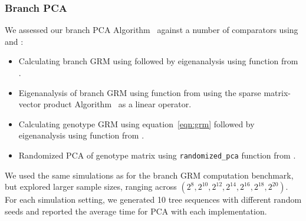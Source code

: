 \subsubsection{Branch PCA}

We assessed our branch PCA Algorithm~ against a number of comparators
using \scipy{} \citep{Virtanen2020SciPy} and \scikitallel{} \citep{Miles2024scikit}:
%
\begin{itemize}
    \item Calculating branch GRM using \tsGRM{} followed by eigenanalysis using \eigh{} function from \scipy{}.
    \item Eigenanalysis of branch GRM using \eigsh{} function from \scipy{} using the sparse matrix-vector product Algorithm~ as a linear operator.
    \item Calculating genotype GRM using equation~\eqref{eqn:grm} followed by eigenanalysis using \eigh{} function from \scipy{}.
    \item Randomized PCA of genotype matrix using \texttt{randomized\_pca} function from \scikitallel{}.
\end{itemize}
%
We used the same simulations as for the branch GRM computation benchmark,
but explored larger sample sizes, ranging across $(2^8, 2^{10}, 2^{12}, 2^{14}, 2^{16}, 2^{18}, 2^{20})$.
%
For each simulation setting, we generated 10 tree sequences with different random seeds and
reported the average time for PCA with each implementation.

